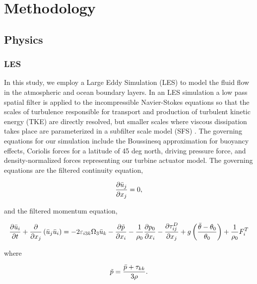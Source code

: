 \section{Methodology}

\subsection{Physics}


\subsubsection{LES}
In this study, we employ a Large Eddy Simulation (LES) to model the fluid flow in the atmospheric and ocean boundary layers.  In an LES simulation a low pass spatial filter is applied to the incompressible Navier-Stokes equations so that the scales of turbulence responsible for transport and production of turbulent kinetic energy (TKE) are directly resolved, but smaller scales where viscous dissipation takes place are parameterized in a subfilter scale model (SFS) \cite{moeng_large-eddy-simulation_1984}.  The governing equations for our simulation include the Boussinesq approximation for buoyancy effects, Coriolis forces for a latitude of 45 deg north, driving pressure force, and density-normalized forces representing our turbine actuator model.  The governing equations are the filtered continuity equation,

\begin{equation}
   \label{filtered_continuity}
   \frac{\partial \bar{u}_j}{\partial x_j} = 0,
\end{equation}

and the filtered momentum equation,

\begin{equation}
   \label{filtered_momentum}
   \frac{\partial \bar{u}_i}{\partial t} 
   + \frac{\partial}{\partial x_j}\left(\bar{u}_j \bar{u}_i \right)
   = -2\varepsilon_{i3k}\Omega_{3} \bar{u}_k 
   - \frac{\partial \tilde{p}}{\partial x_i} 
   - \frac{1}{\rho_0} \frac{\partial p_0}{\partial x_i}
   - \frac{\partial \tau^D_{ij}}{\partial x_j} 
   + g \left( \frac{\bar{\theta} - \theta_0}{\theta_0} \right)
   + \frac{1}{\rho_0}F^T_i
\end{equation}

where

\begin{equation}
   \label{eq:modified_pressure}
   \tilde{p} = \frac{\bar{p} + \tau_{kk}}{3 \rho}.
\end{equation}


